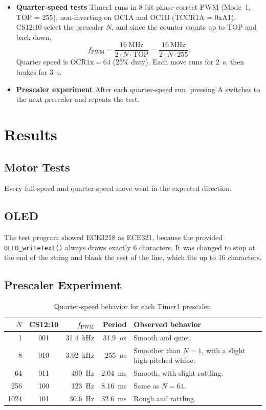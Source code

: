\documentclass[11pt]{article}
\begin{document}
\begin{itemize}
\item \textbf{Quarter-speed tests} Timer1 runs in 8-bit phase-correct PWM (Mode~1, TOP = 255), non-inverting on OC1A and OC1B (TCCR1A = 0xA1). CS12:10 select the prescaler $N$, and since the counter counts up to TOP and back down,
\begin{equation}
  f_\text{PWM} = \frac{16~\text{MHz}}{2 \cdot N \cdot \text{TOP}} = \frac{16~\text{MHz}}{2 \cdot N \cdot 255}.
  \label{eq:fpwm}
\end{equation}
Quarter speed is $\text{OCR1x} = 64$ (25\% duty). Each move runs for 2~s, then brakes for 3~s.

\item \textbf{Prescaler experiment} After each quarter-speed run, pressing A switches to the next prescaler and repeats the test.
\end{itemize}

\section{Results}
\subsection{Motor Tests}
Every full-speed and quarter-speed move went in the expected direction.

\subsection{OLED}
The test program showed ECE3218 as ECE321, because the provided \texttt{OLED\_writeText()} always draws exactly 6 characters. It was changed to stop at the end of the string and blank the rest of the line, which fits up to 16 characters.

\subsection{Prescaler Experiment}

\begin{table}[H]
  \centering
  \caption{Quarter-speed behavior for each Timer1 prescaler.}
  \label{tab:prescale}
  \begin{tabular}{rcrr>{\raggedright\arraybackslash}p{7.8cm}}
    \toprule
    $N$ & CS12:10 & $f_\text{PWM}$ & Period & Observed behavior \\
    \midrule
    1    & 001 & 31.4~kHz & 31.9~$\mu$s & Smooth and quiet. \\
    8    & 010 & 3.92~kHz & 255~$\mu$s  & Smoother than $N = 1$, with a slight high-pitched whine. \\
    64   & 011 & 490~Hz   & 2.04~ms     & Smooth, with slight rattling. \\
    256  & 100 & 123~Hz   & 8.16~ms     & Same as $N = 64$. \\
    1024 & 101 & 30.6~Hz  & 32.6~ms     & Rough and rattling. \\
    \bottomrule
  \end{tabular}
\end{table}
\end{document}
